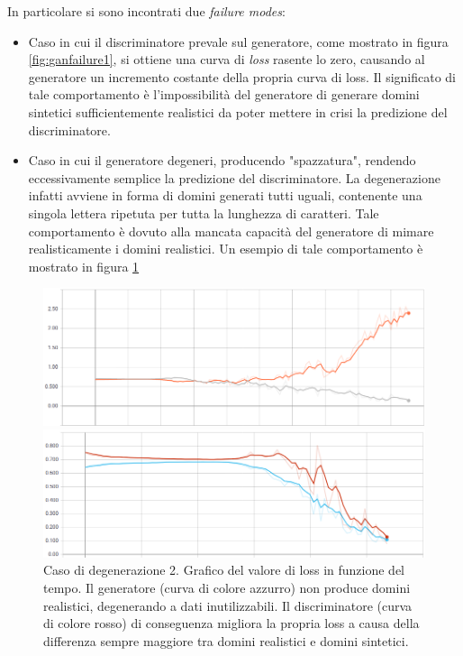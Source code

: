 In particolare si sono incontrati due \textit{failure modes}:
\begin{itemize}
\item Caso in cui il discriminatore prevale sul generatore, come mostrato in figura \ref{fig:ganfailure1}, si ottiene una curva di \textit{loss} rasente lo zero, causando al generatore un incremento costante della propria curva di loss. Il significato di tale comportamento è l'impossibilità del generatore di generare domini sintetici sufficientemente realistici da poter mettere in crisi la predizione del discriminatore.
\item Caso in cui il generatore degeneri, producendo "spazzatura", rendendo eccessivamente semplice la predizione del discriminatore. La degenerazione infatti avviene in forma di domini generati tutti uguali, contenente una singola lettera ripetuta per tutta la lunghezza di caratteri. Tale comportamento è dovuto alla mancata capacità del generatore di mimare realisticamente i domini realistici. Un esempio di tale comportamento è mostrato in figura \ref{fig:ganfailure2}
\end{itemize}

\begin{figure}[!bp]
    \centering
    \includegraphics[width=\columnwidth]{figures/gan/ganfailure1.png}
    \caption{Caso di degenerazione 1. Grafico del valore di loss in funzione del tempo. Il discriminatore (curva di colore grigio) prevale sul generatore (curva arancione), il quale non riesce a migliorare il proprio valore di loss.\label{fig:ganfailure1}}

    \centering
    \includegraphics[width=\columnwidth]{figures/gan/ganfailure2.png}
    \caption{Caso di degenerazione 2. Grafico del valore di loss in funzione del tempo. Il generatore (curva di colore azzurro) non produce domini realistici, degenerando a dati inutilizzabili. Il discriminatore (curva di colore rosso) di conseguenza migliora la propria loss a causa della differenza sempre maggiore tra domini realistici e domini sintetici. \label{fig:ganfailure2}}
\end{figure}

